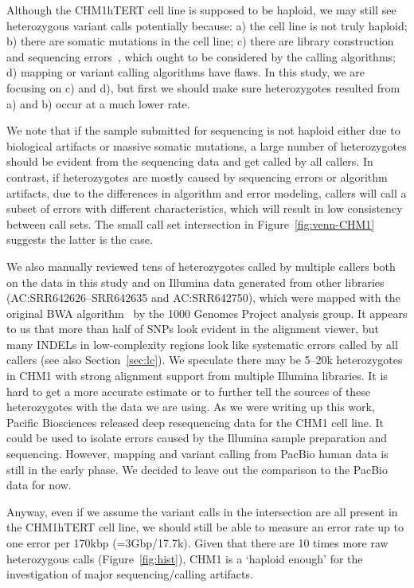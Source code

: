 \documentclass{bioinfo}
\begin{document}
Although the CHM1hTERT cell line is supposed to be haploid, we may still see
heterozygous variant calls potentially because: a) the cell line is not truly
haploid; b) there are somatic mutations in the cell line; c) there are
library construction and sequencing errors~\citep{Robasky:2014aa}, which ought
to be considered by the calling algorithms; d) mapping or variant calling
algorithms have flaws. In this study, we are focusing on c) and d), but first
we should make sure heterozygotes resulted from a) and b) occur at a much lower
rate.

We note that if the sample submitted for sequencing is not haploid either due
to biological artifacts or massive somatic mutations, a large number of
heterozygotes should be evident from the sequencing data and get called by all
callers. In contrast, if heterozygotes are mostly caused by sequencing errors
or algorithm artifacts, due to the differences in algorithm and error modeling,
callers will call a subset of errors with different characteristics, which will
result in low consistency between call sets. The small call set intersection in
Figure~\ref{fig:venn-CHM1} suggests the latter is the case.

We also manually reviewed tens of heterozygotes called by multiple callers both
on the data in this study and on Illumina data generated from other libraries
(AC:SRR642626--SRR642635 and AC:SRR642750), which were mapped with the original BWA
algorithm~\citep{Li:2009uq} by the 1000 Genomes Project analysis group. It
appears to us that more than half of SNPs look evident in the alignment viewer,
but many INDELs in low-complexity regions look like systematic errors called by
all callers (see also Section~\ref{sec:lc}).  We speculate there may be 5--20k
heterozygotes in CHM1 with strong alignment support from multiple Illumina
libraries. It is hard to get a more accurate estimate or to further tell the
sources of these heterozygotes with the data we are using. As we were writing up
this work, Pacific Biosciences released deep resequencing data for the CHM1
cell line. It could be used to isolate errors caused by the Illumina
sample preparation and sequencing. However, mapping and variant calling from
PacBio human data is still in the early phase. We decided to leave out the comparison
to the PacBio data for now.

Anyway, even if we assume the variant calls in the intersection are all present
in the CHM1hTERT cell line, we should still be able to measure an error rate up
to one error per 170kbp (=3Gbp/17.7k). Given that there are 10 times more raw
heterozygous calls (Figure~\ref{fig:hist}), CHM1 is a `haploid enough' for the
investigation of major sequencing/calling artifacts.
\end{document}
